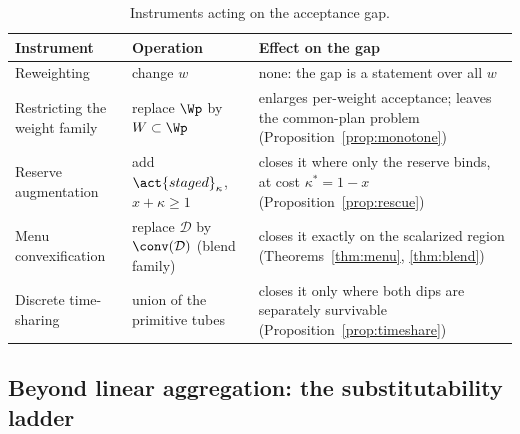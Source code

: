 \begin{table}[!htbp]
\centering\small
\caption{Instruments acting on the acceptance gap.}
\label{tab:instruments}
\begin{tabularx}{\textwidth}{@{}>{\raggedright\arraybackslash}p{}>{\raggedright\arraybackslash}p{}X@{}}
\toprule
Instrument & Operation & Effect on the gap \\
\midrule
Reweighting & change $w$ & none: the gap is a statement over all $w$ \\
Restricting the weight family & replace $\Wp$ by $W\subset\Wp$ & enlarges per-weight acceptance; leaves the common-plan problem (Proposition~\ref{prop:monotone}) \\
Reserve augmentation & add $\act{staged}_\kappa$, $x+\kappa\ge1$ & closes it where only the reserve binds, at cost $\kappa^*=1-x$ (Proposition~\ref{prop:rescue}) \\
Menu convexification & replace $\mathcal D$ by $\conv(\mathcal D)$ (blend family) & closes it exactly on the scalarized region (Theorems~\ref{thm:menu}, \ref{thm:blend}) \\
Discrete time-sharing & union of the primitive tubes & closes it only where both dips are separately survivable (Proposition~\ref{prop:timeshare}) \\
\bottomrule
\end{tabularx}
\end{table}

\subsection{Beyond linear aggregation: the substitutability ladder}\label{sec:ladder}

